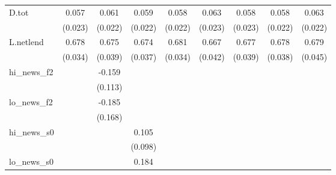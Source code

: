 {\begin{tabular}{l*{8}{c}}
D.tot       &       0.057\sym{**} &       0.061\sym{**} &       0.059\sym{**} &       0.058\sym{**} &       0.063\sym{***}&       0.058\sym{**} &       0.058\sym{**} &       0.063\sym{***}\\
            &     (0.023)         &     (0.022)         &     (0.022)         &     (0.022)         &     (0.023)         &     (0.023)         &     (0.022)         &     (0.022)         \\
\addlinespace
L.netlend   &       0.678\sym{***}&       0.675\sym{***}&       0.674\sym{***}&       0.681\sym{***}&       0.667\sym{***}&       0.677\sym{***}&       0.678\sym{***}&       0.679\sym{***}\\
            &     (0.034)         &     (0.039)         &     (0.037)         &     (0.034)         &     (0.042)         &     (0.039)         &     (0.038)         &     (0.045)         \\
\addlinespace
hi\_news\_f2  &                     &      -0.159         &                     &                     &                     &                     &                     &                     \\
            &                     &     (0.113)         &                     &                     &                     &                     &                     &                     \\
\addlinespace
lo\_news\_f2  &                     &      -0.185         &                     &                     &                     &                     &                     &                     \\
            &                     &     (0.168)         &                     &                     &                     &                     &                     &                     \\
\addlinespace
hi\_news\_s0  &                     &                     &       0.105         &                     &                     &                     &                     &                     \\
            &                     &                     &     (0.098)         &                     &                     &                     &                     &                     \\
\addlinespace
lo\_news\_s0  &                     &                     &       0.184\sym{**} &                     &                     &                     &                     &                     \\

\end{tabular}}
